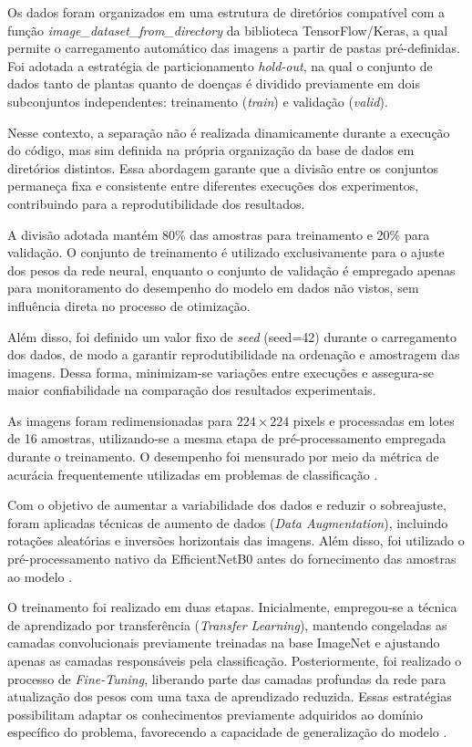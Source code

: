 \documentclass[portuguese]{sbc2025}%
\begin{document}
Os dados foram organizados em uma estrutura de diretórios compatível com a função \textit{image\_dataset\_from\_directory}
da biblioteca TensorFlow/Keras, a qual permite o carregamento automático das imagens a partir de pastas pré-definidas. 
Foi adotada a estratégia de particionamento \textit{hold-out}, na qual o conjunto de dados tanto de plantas quanto de doenças
é dividido previamente em dois subconjuntos independentes: treinamento (\textit{train}) e validação (\textit{valid}).

Nesse contexto, a separação não é realizada dinamicamente durante a execução do código, mas sim definida na própria organização da
base de dados em diretórios distintos. Essa abordagem garante que a divisão entre os conjuntos permaneça fixa e consistente entre
diferentes execuções dos experimentos, contribuindo para a reprodutibilidade dos resultados.

A divisão adotada mantém 80\% das amostras para treinamento e 20\% para validação. O conjunto de treinamento é 
utilizado exclusivamente para o ajuste dos pesos da rede neural, enquanto o conjunto de validação é empregado apenas para 
monitoramento do desempenho do modelo em dados não vistos, sem influência direta no processo de otimização.

Além disso, foi definido um valor fixo de \textit{seed} (seed=42) durante o carregamento dos dados, de modo a garantir 
reprodutibilidade na ordenação e amostragem das imagens. Dessa forma, minimizam-se variações entre execuções e assegura-se 
maior confiabilidade na comparação dos resultados experimentais.

As imagens foram redimensionadas para $224 \times 224$ pixels e processadas em lotes de 16 amostras, utilizando-se a mesma 
etapa de pré-processamento empregada durante o treinamento. O desempenho foi mensurado por meio da métrica de acurácia 
frequentemente utilizadas em problemas de classificação \citep{ref20}.

Com o objetivo de aumentar a variabilidade dos dados e reduzir o sobreajuste, foram aplicadas técnicas de aumento de dados 
(\textit{Data Augmentation}), incluindo rotações aleatórias e inversões horizontais das imagens. Além disso, foi utilizado o 
pré-processamento nativo da EfficientNetB0 antes do fornecimento das amostras ao modelo \citep{ref19,ref4}.

O treinamento foi realizado em duas etapas. Inicialmente, empregou-se a técnica de aprendizado por transferência
(\textit{Transfer Learning}), mantendo congeladas as camadas convolucionais previamente treinadas na base ImageNet e 
ajustando apenas as camadas responsáveis pela classificação. Posteriormente, foi realizado o processo de \textit{Fine-Tuning},
liberando parte das camadas profundas da rede para atualização dos pesos com uma taxa de aprendizado reduzida. Essas estratégias
possibilitam adaptar os conhecimentos previamente adquiridos ao domínio específico do problema, favorecendo a capacidade de 
generalização do modelo \citep{ref20,ref21}.
\end{document}
